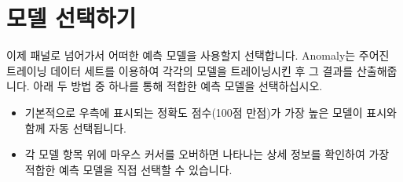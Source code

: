 \documentclass[letterpaper,10pt,english]{sphinxmanual}
\begin{document}
\section{모델 선택하기}
\label{\detokenize{part02/index:select-model}}\label{\detokenize{part02/index:id5}}
이제  패널로 넘어가서 어떠한 예측 모델을 사용할지 선택합니다. Anomaly는 주어진 트레이닝 데이터 세트를 이용하여 각각의 모델을 트레이닝시킨 후 그 결과를 산출해줍니다. 아래 두 방법 중 하나를 통해 적합한 예측 모델을 선택하십시오.
\begin{itemize}
\item {} 
기본적으로 우측에 표시되는 정확도 점수(100점 만점)가 가장 높은 모델이  표시와 함께 자동 선택됩니다.
\begin{quote}

\begin{figure}[H]
\centering

\noindent{}
\end{figure}
\end{quote}

\item {} 
각 모델 항목 위에 마우스 커서를 오버하면 나타나는 상세 정보를 확인하여 가장 적합한 예측 모델을 직접 선택할 수 있습니다.
\begin{quote}

\begin{figure}[H]
\centering

\noindent{}
\end{figure}
\end{quote}

\end{itemize}
\end{document}
